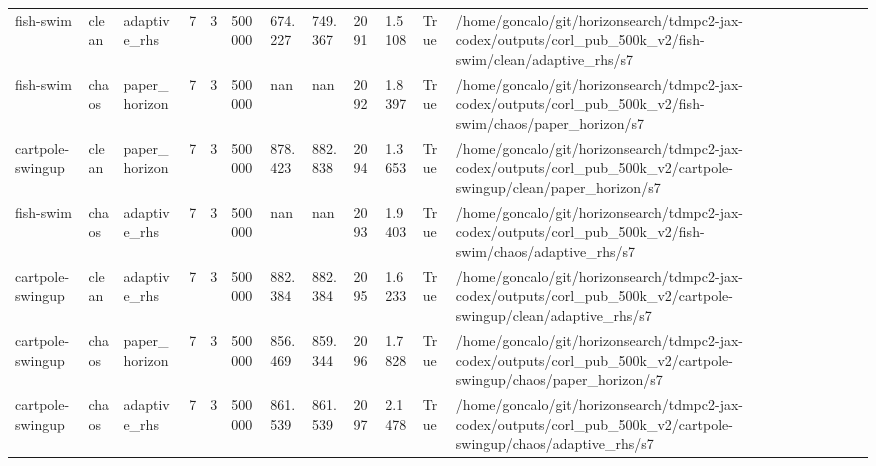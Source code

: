 \begin{tabular}{llllllllllll}
fish-swim & clean & adaptive\_rhs & 7 & 3 & 500000 & 674.227 & 749.367 & 2091 & 1.5108 & True & /home/goncalo/git/horizonsearch/tdmpc2-jax-codex/outputs/corl\_pub\_500k\_v2/fish-swim/clean/adaptive\_rhs/s7 \\
fish-swim & chaos & paper\_horizon & 7 & 3 & 500000 & nan & nan & 2092 & 1.8397 & True & /home/goncalo/git/horizonsearch/tdmpc2-jax-codex/outputs/corl\_pub\_500k\_v2/fish-swim/chaos/paper\_horizon/s7 \\
cartpole-swingup & clean & paper\_horizon & 7 & 3 & 500000 & 878.423 & 882.838 & 2094 & 1.3653 & True & /home/goncalo/git/horizonsearch/tdmpc2-jax-codex/outputs/corl\_pub\_500k\_v2/cartpole-swingup/clean/paper\_horizon/s7 \\
fish-swim & chaos & adaptive\_rhs & 7 & 3 & 500000 & nan & nan & 2093 & 1.9403 & True & /home/goncalo/git/horizonsearch/tdmpc2-jax-codex/outputs/corl\_pub\_500k\_v2/fish-swim/chaos/adaptive\_rhs/s7 \\
cartpole-swingup & clean & adaptive\_rhs & 7 & 3 & 500000 & 882.384 & 882.384 & 2095 & 1.6233 & True & /home/goncalo/git/horizonsearch/tdmpc2-jax-codex/outputs/corl\_pub\_500k\_v2/cartpole-swingup/clean/adaptive\_rhs/s7 \\
cartpole-swingup & chaos & paper\_horizon & 7 & 3 & 500000 & 856.469 & 859.344 & 2096 & 1.7828 & True & /home/goncalo/git/horizonsearch/tdmpc2-jax-codex/outputs/corl\_pub\_500k\_v2/cartpole-swingup/chaos/paper\_horizon/s7 \\
cartpole-swingup & chaos & adaptive\_rhs & 7 & 3 & 500000 & 861.539 & 861.539 & 2097 & 2.1478 & True & /home/goncalo/git/horizonsearch/tdmpc2-jax-codex/outputs/corl\_pub\_500k\_v2/cartpole-swingup/chaos/adaptive\_rhs/s7 \\
\bottomrule
\end{tabular}
